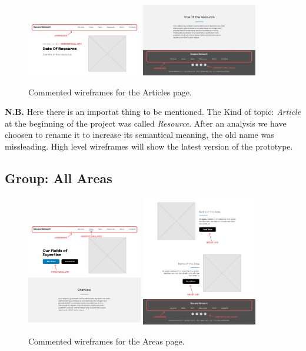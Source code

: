 \documentclass[12pt]{report}
\begin{document}
\begin{figure}[H]
	\centering
	\includegraphics[width=0.45\textwidth]{low_fid_wireframes/article/1.png}
	\includegraphics[width=0.45\textwidth]{low_fid_wireframes/article/2.png}
	\caption{Commented wireframes for the Articles page.}
\end{figure}
\textbf{N.B.} Here there is an importat thing to be mentioned. The Kind of topic: \emph{Article} at the 
beginning of the project was called \emph{Resource}. After an analysis we have choosen to
rename it to increase its semantical meaning, the old name was missleading.
High level wireframes will show the latest version of the prototype.
\subsection{Group: All Areas}

\begin{figure}[H]
	\centering
	\includegraphics[width=0.45\textwidth]{low_fid_wireframes/all_areas/1.png}
	\includegraphics[width=0.45\textwidth]{low_fid_wireframes/all_areas/2.png}
	\caption{Commented wireframes for the Areas page.}
\end{figure}
\end{document}
